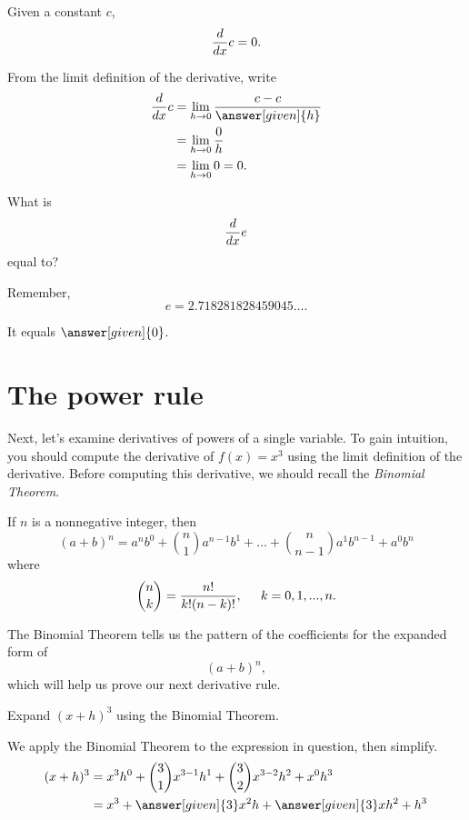 \documentclass{ximera}
\begin{document}
\begin{theorem}
	Given a constant $c$,
	\[ \frac{d}{\mathop{}\!d x} c = 0. \]

	\begin{explanation}
		From the limit definition of the derivative, write
		\begin{align*}
			\ddx c &= \lim_{h\to 0}\frac{c-c}{\answer[given]{h}}\\
			&= \lim_{h\to 0} \frac{0}{h}\\
			&= \lim_{h\to 0} 0 = 0.
		\end{align*}
	\end{explanation}
\end{theorem}

\begin{question}
  What is
  \[
  \frac{d}{\mathop{}\!d x} e
  \]
  equal to?
  \begin{hint}
    Remember,
    \[
    e = 2.718281828459045\dots.
    \]
  \end{hint}
  \begin{prompt}
    It equals $\answer[given]{0}$.
  \end{prompt}
\end{question}


\section{The power rule}

Next, let's examine derivatives of powers of a single variable. 
To gain intuition, you should compute the
derivative of $f(x) = x^3$ using the limit definition of the
derivative. Before computing this derivative, we should recall 
the \textit{Binomial Theorem}.

\begin{theorem}
	If $n$ is a nonnegative integer, then
	\[ (a+b)^n = a^nb^0 + \binom{n}{1} a^{n-1}b^1 + \dots + \binom{n}{n-1} a^{1}b^{n-1} +  a^{0}b^n    \]
	where
	\[ \binom{n}{k} = \frac{n!}{k!(n-k)!}, \hspace{0.2in}k=0,1,...,n. \]
\end{theorem}

The Binomial Theorem tells us the pattern of the coefficients for the
expanded form of
\[ (a+b)^n, \]
which will help us prove our next derivative rule.

\begin{example}
	Expand $(x+h)^3$ using the Binomial Theorem.
	\begin{explanation}
		We apply the Binomial Theorem to the expression in question, then simplify.
		\begin{align*}
			(x+h)^3 &= x^3h^0 + \binom{3}{1} x^{3-1}h^1 + \binom{3}{2} x^{3-2}h^2 + x^{0}h^3\\
				& = x^3 + \answer[given]{3} x^2 h + \answer[given]{3} xh^2 + h^3
		\end{align*}
	\end{explanation}
\end{example}
\end{document}
